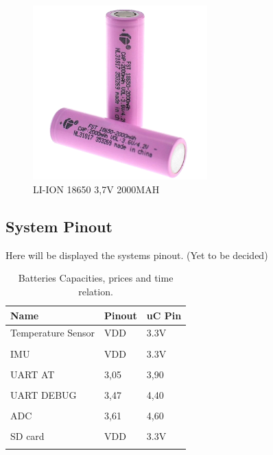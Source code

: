 
\begin{figure}[H]
    \centering
    \includegraphics[width=0.6\textwidth]{images/chapter/design/components/batt.jpg}  %
    \caption{LI-ION 18650 3,7V 2000MAH}
    \label{fig:Battery}        
\end{figure}

\subsection{System Pinout}

Here will be displayed the systems pinout. (Yet to be decided)

\begin{table}[h!]
    \centering
    \begin{tabular}{l|l|l}

        Name & Pinout & uC Pin \\
        \hline
        Temperature Sensor & VDD  & 3.3V\\
                           &      &     \\
        IMU                & VDD  & 3.3V\\
                           &      &     \\
        UART AT            & 3,05 & 3,90\\
                           &      &     \\
        UART DEBUG         & 3,47 & 4,40\\
                           &      &     \\
        ADC                & 3,61 & 4,60\\
                           &      &     \\
        SD card            & VDD  & 3.3V\\
                           &      &     \\
    \end{tabular}
    \caption{Batteries Capacities, prices and time relation.}
    \label{table: Batteries Capacities, prices and time relation.}
\end{table}

